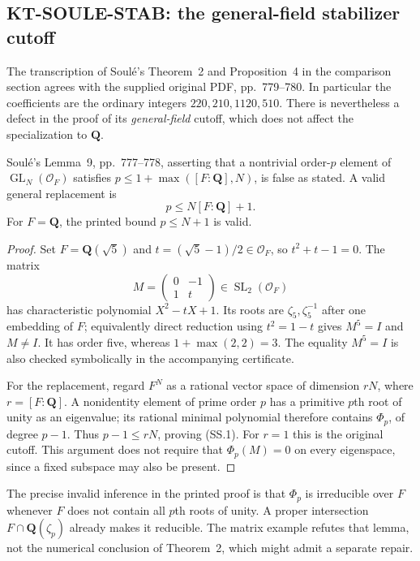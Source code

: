 \subsection{KT-SOULE-STAB: the general-field stabilizer cutoff}
\label{sec:kt-soule-stab}

The transcription of Soul\'e's Theorem~2 and Proposition~4
in the comparison section agrees with the supplied original
PDF, pp.~779--780. In particular the coefficients are the
ordinary integers $220,210,1120,510$. There is nevertheless
a defect in the proof of its \emph{general-field} cutoff,
which does not affect the specialization to $\mathbf Q$.

\begin{proposition}
Soul\'e's Lemma~9, pp.~777--778, asserting that a nontrivial
order-$p$ element of $\operatorname{GL}_N(\mathcal O_F)$
satisfies $p\leq1+\max([F:\mathbf Q],N)$, is false as
stated. A valid general replacement is
\[
                         p\leq N[F:\mathbf Q]+1.
                                                               \tag{SS.1}
\]
For $F=\mathbf Q$, the printed bound $p\leq N+1$ is valid.
\end{proposition}

\begin{proof}
Set $F=\mathbf Q(\sqrt5)$ and
$t=(\sqrt5-1)/2\in\mathcal O_F$, so $t^2+t-1=0$.
The matrix
\[
              M=\begin{pmatrix}0&-1\\1&t\end{pmatrix}
                \in\operatorname{SL}_2(\mathcal O_F)
\]
has characteristic polynomial $X^2-tX+1$.
Its roots are $\zeta_5,\zeta_5^{-1}$ after one embedding
of $F$; equivalently direct reduction using $t^2=1-t$
gives $M^5=I$ and $M\ne I$. It has order five, whereas
$1+\max(2,2)=3$. The equality $M^5=I$ is also checked
symbolically in the accompanying certificate.

For the replacement, regard $F^N$ as a rational vector space
of dimension $rN$, where $r=[F:\mathbf Q]$. A nonidentity
element of prime order $p$ has a primitive $p$th root of
unity as an eigenvalue; its rational minimal polynomial
therefore contains $\Phi_p$, of degree $p-1$.
Thus $p-1\leq rN$, proving (SS.1). For $r=1$ this is
the original cutoff. This argument does not require that
$\Phi_p(M)=0$ on every eigenspace, since a fixed subspace
may also be present.
\end{proof}

The precise invalid inference in the printed proof is that
$\Phi_p$ is irreducible over $F$ whenever $F$ does not
contain all $p$th roots of unity. A proper intersection
$F\cap\mathbf Q(\zeta_p)$ already makes it reducible.
The matrix example refutes that lemma, not the numerical
conclusion of Theorem~2, which might admit a separate repair.

